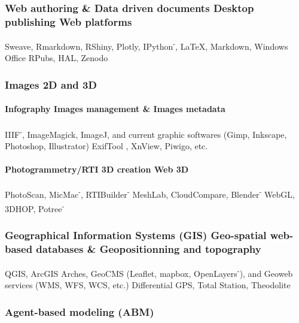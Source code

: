 \documentclass{article}
\begin{document}
\subsubsection*{Web authoring \& Data driven documents {\textbar} Desktop publishing {\textbar} Web platforms}

\textsf{Sweave}, \textsf{Rmarkdown}, \textsf{RShiny}, \textsf{Plotly}, \textsf{IPython\textsuperscript{-}}, \textbf{{\textbar}} \LaTeX, \textsf{Markdown}, Windows Office \textbf{{\textbar}} RPubs, HAL, Zenodo

\subsubsection*{Images 2D and 3D}

\paragraph*{Infography {\textbar} Images management \& Images metadata}

IIIF\textsuperscript{-}, ImageMagick, ImageJ, and current graphic softwares (Gimp, Inkscape, Photoshop, Illustrator) {\textbar} ExifTool , XnView, Piwigo, etc.

\paragraph*{Photogrammetry/RTI {\textbar} 3D creation {\textbar} Web 3D}

PhotoScan, MicMac\textsuperscript{-}, RTIBuilder\textsuperscript{-} {\textbar} MeshLab, CloudCompare, Blender\textsuperscript{-} \textbf{{\textbar}} WebGL, 3DHOP, Potree\textsuperscript{-}

\subsubsection*{Geographical Information Systems (GIS) {\textbar} Geo-spatial web-based databases \&  {\textbar} Geopositionning and topography}

QGIS, ArcGIS {\textbar} Arches, GeoCMS (\textsf{Leaflet}, \textsf{mapbox}, \textsf{OpenLayers\textsuperscript{-}}), and Geoweb services (WMS, WFS, WCS, etc.) {\textbar} Differential GPS, Total Station, Theodolite

\subsubsection*{Agent-based modeling (ABM)}
\end{document}
